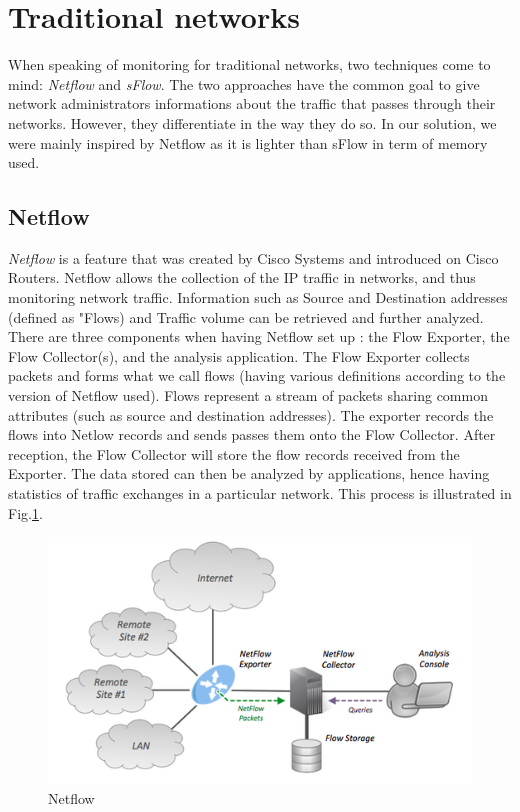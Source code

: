 \section{Traditional networks}

When speaking of monitoring for traditional networks, two techniques come to mind: \textit{Netflow} and \textit{sFlow}. The two approaches have the common goal to give network administrators informations about the traffic that passes through their networks. However, they differentiate in the way they do so. In our solution, we were mainly inspired by Netflow as it is lighter than sFlow in term of memory used.

\subsection{Netflow}

\textit{Netflow} is a feature that was created by Cisco Systems and introduced on Cisco Routers. Netflow allows the collection of the IP traffic in networks, and thus monitoring network traffic. Information such as Source and Destination addresses (defined as "Flows) and Traffic volume can be retrieved and further analyzed.\\

There are three components when having Netflow set up : the Flow Exporter, the Flow Collector(s), and the analysis application. The Flow Exporter collects packets and forms what we call flows (having various definitions according to the version of Netflow used). Flows represent a stream of packets sharing common attributes (such as source and destination addresses). The exporter records the flows into Netlow records and sends passes them onto the Flow Collector. After reception, the Flow Collector will store the flow records received from the Exporter. The data stored can then be analyzed by applications, hence having statistics of traffic exchanges in a particular network. This process is illustrated in Fig.\ref{fig:netflow}.\\

\begin{figure}
  \centering
  \includegraphics[width=\textwidth]{res/netflow.png}
  \caption{Netflow}
  \label{fig:netflow}
\end{figure}

